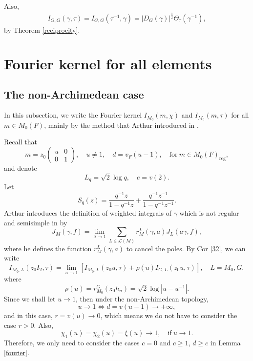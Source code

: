 \documentclass[11pt]{amsart}
\renewcommand{\rm}{\mathrm}
\theoremstyle{definition}
\numberwithin{equation}{section}
\begin{document}
Also,
	\begin{align}
		I_{G,G}(\gamma,\tau)=I_{G,G}(\tau^{-1}, \gamma) = |D_G(\gamma)|^{\frac{1}{2}} \Theta_{\tau}( \gamma^{-1}),
	\end{align}
	by Theorem \ref{reciprocity}.
















    
	
	
	
	
	
	
	
	
	\section{Fourier kernel for all elements}
	\subsection{The non-Archimedean case}
	In this subsection, we write the Fourier kernel \(I_{M_0}(m,\chi)\) and \(I_{M_0}(m,\tau)\) for all \(m\in M_0(F)\), mainly by the method that Arthur introduced in \cite{Art88}.
	
	
	Recall that
	\[
	m = z_0 \begin{pmatrix} u & 0 \\ 0 & 1 \end{pmatrix}, \quad u \neq 1, \quad d = v_F(u-1),\quad \text{for}\ m\in M_0(F)_{\rm{reg}},
	\]
	and denote
	\[
	L_q = \sqrt{2} \log q, \quad e = v(2).
	\]
	Let
	\[
	S_q(z) = \frac{q^{-1}z}{1 - q^{-1}z} + \frac{q^{-1}z^{-1}}{1 - q^{-1}z^{-1}}.
	\]
	Arthur introduces the definition of weighted integrals of \(\gamma\) which is not regular and semisimple in \cite{Art88} by
	\[J_M(\gamma, f) = \lim_{a \to 1} \sum_{L \in \mathcal{L}(M)} r_M^L(\gamma, a) J_L(a\gamma, f),\]where he defines the function \(r_M^L(\gamma,a)\) to cancel the poles. By Cor \ref{32}, we can write 
	\[
	I_{M_0,L}(z_0I_2, \tau) = \lim_{u \to 1} \left[ I_{M_0,L}(z_0u, \tau) + \rho(u) I_{G,L}(z_0u, \tau) \right], \quad L = M_0, G,
	\]where
	\[
	\rho(u)=r_{M_0}^G(z_0h_u)= \sqrt{2} \log |u - u^{-1}|.
	\]
	Since we shall let \(u\rightarrow 1\), then under the non-Archimedean topology,
	\[
	u \to 1 \iff d = v(u-1) \to +\infty,
	\]and in this case, \(r=v(u)\rightarrow0\), which means we do not have to consider the case \(r>0\). Also, \[\chi_1(u)=\chi_2(u)=\xi(u)\rightarrow1,\quad \text{if}\ u\rightarrow 1.\]
	Therefore, we only need to consider the cases \(c=0\) and \(c\ge1\), \(d\ge c\) in Lemma \ref{fourier}.
	
\end{document}
